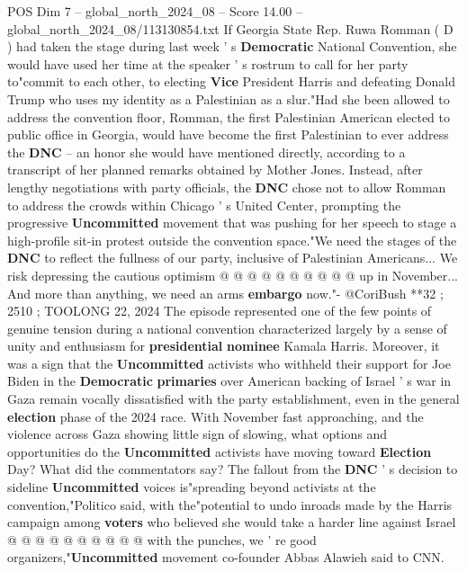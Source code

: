\begin{textsample}{POS Dim 7 – global\_north\_2024\_08 – Score 14.00 – global\_north\_2024\_08/113130854.txt}  \label{ex:f7_pos_007}
If Georgia State Rep.
Ruwa Romman ( D ) had taken the stage during last week ' s \textbf{Democratic} National Convention, she would have used her time at the speaker ' s rostrum to call for her party to"commit to each other, to electing \textbf{Vice} President Harris and defeating Donald Trump who uses my identity as a Palestinian as a slur."Had she been allowed to address the convention floor, Romman, the first Palestinian American elected to public office in Georgia, would have become the first Palestinian to ever address the \textbf{DNC} -- an honor she would have mentioned directly, according to a transcript of her planned remarks obtained by Mother Jones.
Instead, after lengthy negotiations with party officials, the \textbf{DNC} chose not to allow Romman to address the crowds within Chicago ' s United Center, prompting the progressive \textbf{Uncommitted} movement that was pushing for her speech to stage a high-profile sit-in protest outside the convention space."We need the stages of the \textbf{DNC} to reflect the fullness of our party, inclusive of Palestinian Americans...
We risk depressing the cautious optimism @ @ @ @ @ @ @ @ @ @ up in November...
And more than anything, we need an arms \textbf{embargo} now."- @CoriBush **32 ; 2510 ; TOOLONG 22, 2024 The episode represented one of the few points of genuine tension during a national convention characterized largely by a sense of unity and enthusiasm for \textbf{presidential} \textbf{nominee} Kamala Harris.
Moreover, it was a sign that the \textbf{Uncommitted} activists who withheld their support for Joe Biden in the \textbf{Democratic} \textbf{primaries} over American backing of Israel ' s war in Gaza remain vocally dissatisfied with the party establishment, even in the general \textbf{election} phase of the 2024 race.
With November fast approaching, and the violence across Gaza showing little sign of slowing, what options and opportunities do the \textbf{Uncommitted} activists have moving toward \textbf{Election} Day?
What did the commentators say?
The fallout from the \textbf{DNC} ' s decision to sideline \textbf{Uncommitted} voices is"spreading beyond activists at the convention,"Politico said, with the"potential to undo inroads made by the Harris campaign among \textbf{voters} who believed she would take a harder line against Israel @ @ @ @ @ @ @ @ @ @ with the punches, we ' re good organizers,"\textbf{Uncommitted} movement co-founder Abbas Alawieh said to CNN.

\end{textsample}
